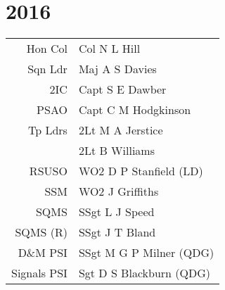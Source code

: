 \chapter*{2016}

\begin{center}
  \small
  \begin{tabular}{rl}
    Hon Col & Col N L Hill \\
    Sqn Ldr & Maj A S Davies \\
    2IC & Capt S E Dawber \\
    PSAO & Capt C M Hodgkinson \\
    Tp Ldrs & 2Lt M A Jerstice \\
     & 2Lt B Williams \\
    RSUSO & WO2 D P Stanfield (LD) \\
    SSM & WO2 J Griffiths \\
    SQMS & SSgt L J Speed \\
    SQMS (R) & SSgt J T Bland \\
    D\&M PSI & SSgt M G P Milner (QDG) \\
    Signals PSI & Sgt D S Blackburn (QDG) \\
  \end{tabular}
\end{center}


